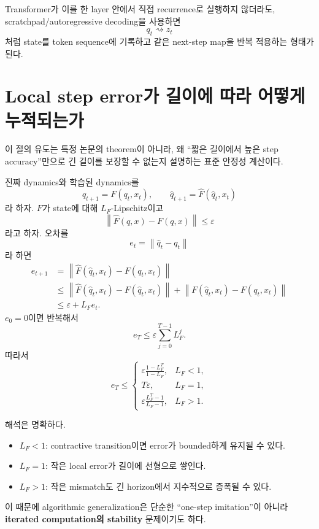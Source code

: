 \documentclass[11pt,a4paper,oneside,openany]{memoir}
\newcommand{\norm}[1]{\left\lVert #1\right\rVert}
\theoremstyle{definition}
\begin{document}
Transformer가 이를 한 layer 안에서 직접 recurrence로 실행하지 않더라도,
scratchpad/autoregressive decoding을 사용하면
\[
q_t\rightsquigarrow z_t
\]
처럼 state를 token sequence에 기록하고 같은 next-step map을 반복 적용하는 형태가 된다.

\section{Local step error가 길이에 따라 어떻게 누적되는가}

\begin{suppbox}
이 절의 유도는 특정 논문의 theorem이 아니라, 왜 ``짧은 길이에서 높은 step accuracy''만으로 긴 길이를 보장할 수 없는지 설명하는 표준 안정성 계산이다.
\end{suppbox}

진짜 dynamics와 학습된 dynamics를
\[
q_{t+1}=F(q_t,x_t),
\qquad
\widehat q_{t+1}=\widehat F(\widehat q_t,x_t)
\]
라 하자. $F$가 state에 대해 $L_F$-Lipschitz이고
\[
\norm{\widehat F(q,x)-F(q,x)}\le\varepsilon
\]
라고 하자.
오차를
\[
e_t=\norm{\widehat q_t-q_t}
\]
라 하면
\[
\begin{aligned}
e_{t+1}
&=\norm{\widehat F(\widehat q_t,x_t)-F(q_t,x_t)}\\
&\le
\norm{\widehat F(\widehat q_t,x_t)-F(\widehat q_t,x_t)}
+\norm{F(\widehat q_t,x_t)-F(q_t,x_t)}\\
&\le \varepsilon+L_F e_t.
\end{aligned}
\]
$e_0=0$이면 반복해서
\[
e_T
\le
\varepsilon\sum_{j=0}^{T-1}L_F^j.
\]
따라서
\[
e_T\le
\begin{cases}
\displaystyle \varepsilon\frac{1-L_F^T}{1-L_F}, & L_F<1,\\[0.8em]
T\varepsilon, & L_F=1,\\[0.4em]
\displaystyle \varepsilon\frac{L_F^T-1}{L_F-1}, & L_F>1.
\end{cases}
\]

해석은 명확하다.

\begin{itemize}
\item $L_F<1$: contractive transition이면 error가 bounded하게 유지될 수 있다.
\item $L_F=1$: 작은 local error가 길이에 선형으로 쌓인다.
\item $L_F>1$: 작은 mismatch도 긴 horizon에서 지수적으로 증폭될 수 있다.
\end{itemize}

이 때문에 algorithmic generalization은 단순한 ``one-step imitation''이 아니라 \textbf{iterated computation의 stability} 문제이기도 하다.
\end{document}
